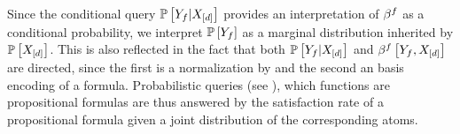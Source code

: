 Since the conditional query $\mathbb{P}\left[Y_{f}|X_{[d]}\right]$ provides an interpretation of $\beta^{f}$ as a conditional probability, we interpret $\mathbb{P}\left[Y_{f}\right]$ as a marginal distribution inherited by $\mathbb{P}\left[X_{[d]}\right]$.
This is also reflected in the fact that both $\mathbb{P}\left[Y_{f}|X_{[d]}\right]$ and $\beta^{f}\left[Y_{f},X_{[d]}\right]$ are directed, since the first is a normalization by  and the second an basis encoding of a formula.
Probabilistic queries (see ), which functions are propositional formulas are thus answered by the satisfaction rate of a propositional formula given a joint distribution of the corresponding atoms.


%	



%		
%

